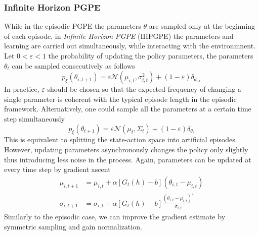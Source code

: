 \subsubsection{Infinite Horizon PGPE}
While in the episodic PGPE the parameters $\theta$ are sampled only at the beginning of each episode, in \emph{Infinite Horizon PGPE} (IHPGPE) \cite{sehnke2012parameter} the parameters and learning are carried out simultaneously, while interacting with the environmnent. Let $0 < \varepsilon < 1$ the probability of updating the policy parameters, the parameters $\theta_t$ can be sampled consecutively as follows
\begin{equation}
	p_\xi(\theta_{i,t+1}) = \varepsilon \mathcal{N}(\mu_{i,t}, \sigma_{i,t}^2) 
							+ (1-\varepsilon) \delta_{\theta_{i,t}}
\end{equation}
In practice, $\varepsilon$ should be chosen so that the expected frequency of
changing a single parameter is coherent with the typical episode length in the
episodic framework. Alternatively, one could sample all the parameters at a
certain time step simultaneously
\begin{equation}
	p_\xi(\theta_{t+1}) = \varepsilon \mathcal{N}(\mu_{t}, \Sigma_t) 
							+ (1-\varepsilon) \delta_{\theta_{t}}
\end{equation}
This is equivalent to splitting the state-action space into artificial
episodes. However, updating parameters asynchronously changes the policy only
slightly thus introducing less noise in the process. Again, parameters can be
updated at every time step by gradient ascent
\begin{equation}
	\begin{split}
		\mu_{i,t+1} &= \mu_{i,t} + \alpha \left[G_t(h) - b\right] (\theta_{i,t}
		- \mu_{i,t})\\
		\sigma_{i,t+1} &= \sigma_{i,t} + \alpha \left[G_t(h) - b\right] 
		\frac{(\theta_{i,t} -\mu_{i,t})^2}{\sigma_{i,t}}
	\end{split}
\end{equation}
Similarly to the episodic case, we can improve the gradient estimate by
symmetric sampling and gain normalization. 


